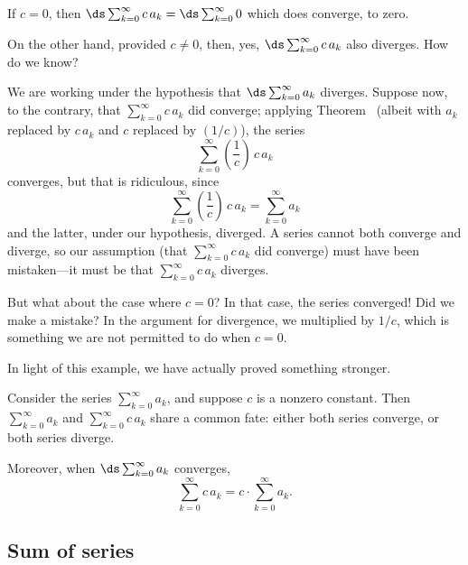 \begin{solution}
  If $c = 0$, then $\ds\sum_{k=0}^\infty c\,a_k = \ds\sum_{k=0}^\infty
  0$ which does converge, to zero.

  On the other hand, provided $c \neq 0$, then, yes,
  $\ds\sum_{k=0}^\infty c\,a_k$ also diverges.  How do we know?
  
  We are working under the hypothesis that $\ds\sum_{k=0}^\infty a_k$
  diverges.  Suppose now, to the contrary, that $\sum_{k=0}^\infty
  c\,a_k$ did converge; applying Theorem~
  (albeit with $a_k$ replaced by $c\,a_k$ and $c$ replaced by
  $(1/c)$), the series
  $$\sum_{k=0}^\infty \left(\frac{1}{c} \right) \,c \, a_k $$ converges, but
  that is ridiculous, since 
  $$\sum_{k=0}^\infty \left(\frac{1}{c} \right) \,c \, a_k = \sum_{k=0}^\infty a_k$$
  and the latter, under our hypothesis, diverged.  A series cannot
  both converge and diverge, so our assumption (that
  $\sum_{k=0}^\infty c\,a_k$ did converge) must have been
  mistaken---it must be that $\sum_{k=0}^\infty c\,a_k$ diverges.
\end{solution}

But what about the case where $c = 0$?  In that case, the series
converged!  Did we make a mistake?  In the argument for divergence, we
multiplied by $1/c$, which is something we are not permitted to do
when $c = 0$.


In light of this example, we have actually proved something stronger.
\begin{theorem}\label{thm:distributive-over-series}
  Consider the series $\sum_{k=0}^\infty a_k$, and suppose $c$ is a
  nonzero constant.  Then $\sum_{k=0}^\infty a_k$ and
  $\sum_{k=0}^\infty c\,a_k$ share a common fate: either both series
  converge, or both series diverge.

  Moreover, when $\ds\sum_{k=0}^\infty a_k$ converges,
  $$
  \sum_{k=0}^\infty c \, a_k = c \cdot \sum_{k=0}^\infty a_k.
  $$
\end{theorem}

\subsection{Sum of series}

